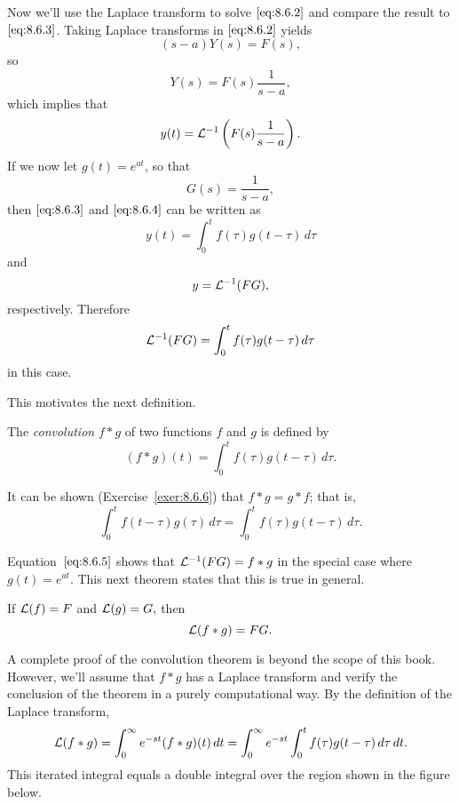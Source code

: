 \documentclass{ximera}
\begin{document}
Now we'll use the Laplace transform to solve $\eqref{eq:8.6.2}$
and compare the result to $\eqref{eq:8.6.3}$. Taking Laplace transforms in
$\eqref{eq:8.6.2}$ yields
$$
(s-a)Y(s)=F(s),
$$
so
$$
Y(s)=F(s) \frac{1}{s-a},
$$
which implies that
\begin{equation}\label{eq:8.6.4}
y(t)= {\cal L}^{-1}\left(F(s)\frac{1}{s-a}\right).
\end{equation}
If we now let $g(t)=e^{at}$, so that
$$
G(s)=\frac{1}{s-a},
$$
then $\eqref{eq:8.6.3}$ and $\eqref{eq:8.6.4}$ can be written as
$$
y(t)=\int_0^tf(\tau)g(t-\tau)\,d\tau
$$
and
$$
y={\cal L}^{-1}(FG),
$$
respectively.  Therefore
\begin{equation}\label{eq:8.6.5}
{\cal L}^{-1}(FG)=\int_0^t f(\tau)g(t-\tau)\,d\tau
\end{equation}
in this case.

This motivates  the next definition.

\begin{definition}\label{thmtype:8.6.1}
The \textit{convolution} $f\ast g$ of two functions $f$
and $g$ is defined by
$$
(f\ast g)(t)=\int_0^t f(\tau)g(t-\tau)\,d\tau.
$$
\end{definition}

It can be shown (Exercise~\ref{exer:8.6.6}) 
that $f\ast g=g\ast f$;   that
is,
$$
\int_0^tf(t-\tau)g(\tau)\,d\tau=\int_0^tf(\tau)g(t-\tau)\,d\tau.
$$

Equation~$\eqref{eq:8.6.5}$ shows that ${\cal L}^{-1}(FG)=f\ast g$ in the special
case where $g(t)=e^{at}$. This next theorem states that this is
true in general.

\begin{theorem}\label{thmtype:8.6.2}
If ${\cal L}(f)=F$  and ${\cal L}(g)=G,$ then
$$
{\cal L}(f\ast g)=FG.
$$
\end{theorem}

A complete proof of the convolution theorem is beyond the scope of
this book. However, we'll assume that $f\ast g$ has a Laplace
transform and verify the conclusion of the theorem in a purely
computational way. By the definition of the Laplace transform,
$$
{\cal L}(f\ast g)=\int_0^\infty e^{-st}(f\ast g)(t)\,dt=\int_0^\infty
e^{-st}
\int_0^t f(\tau)g(t-\tau)\,d\tau\,dt.
$$
This iterated integral equals a double integral over the region shown
in %
the figure below.

\begin{center}
\end{center}
\end{document}
